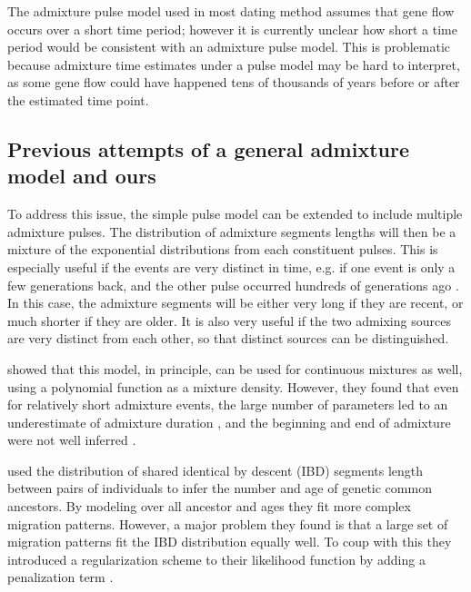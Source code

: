 \documentclass[]{article}
\begin{document}
The admixture pulse model used in most dating method assumes that gene flow occurs over a short time period; however it is currently unclear how short a time period would be consistent with an admixture pulse model. This is problematic because admixture time estimates under a pulse model may be hard to interpret, as some gene flow could have happened tens of thousands of years before or after the estimated time point.



\subsection{Previous attempts of a general admixture model and ours}\label{Previous attempts of a general admixture model and ours}

To address this issue, the simple pulse model can be extended to include  multiple admixture pulses. The distribution of admixture segments lengths will then be a mixture of the exponential distributions from each constituent pulses. This is especially useful if the events are very distinct in time, e.g. if one event is only a few generations back, and the other pulse occurred hundreds of generations ago \citep{fu_genome_2014,slon_genome_2018}. In this case, the admixture segments will be either very long if they are recent, or much shorter if they are older. It is also very useful if the two admixing sources are very distinct from each other, so that distinct sources can be distinguished. 

\cite{zhou_modeling_2017} showed that this model, in principle, can be used for continuous mixtures as well, using a polynomial function as a mixture density. However, they found that even for relatively short admixture events, the large number of parameters led to an underestimate of admixture duration \citep{zhou_inference_2017}, and the beginning and end of admixture were not well inferred
\citep{zhou_modeling_2017,zhou_inference_2017}. 

\cite{ralph_geography_2013} used the distribution of shared identical by descent (IBD)  segments length between pairs of individuals to infer the number and age of genetic common ancestors. By modeling over all ancestor and ages they fit more complex migration patterns. However, a major problem they found is that a large set of migration patterns fit the IBD distribution equally well. To coup with this they introduced a regularization scheme to their likelihood function by adding a penalization term \citep{ralph_geography_2013}.
\end{document}
